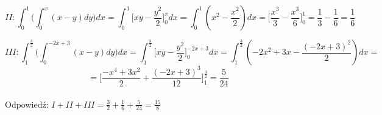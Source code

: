 \documentclass{article}
\begin{document}
$$II: \int_0^1 \Big(\int_0^{x} (x-y)dy\Big)dx = \int_0^1 \Big[ xy-\frac{y^2}{2}\Big]_{0}^{x} dx = \int_0^1 (x^2-\frac{x^2}{2}) dx = \Big[\frac{x^3}{3} - \frac{x^3}{6}\Big]_0^1 =\frac{1}{3}-\frac{1}{6} = \frac{1}{6}$$

$$III: \int_1^{\frac{3}{2}} \Big(\int_0^{-2x+3} (x-y)dy\Big)dx = \int_1^{\frac{3}{2}} \Big[ xy-\frac{y^2}{2}\Big]_{0}^{-2x+3} dx = \int_1^{\frac{3}{2}} (-2x^2+3x-\frac{(-2x+3)^2}{2}) dx = $$
$$= \Big[\frac{-x^4+3x^2}{2} + \frac{(-2x+3)^3}{12}\Big]_1^{\frac{3}{2}} = \frac{5}{24}$$ \\
Odpowiedź: $I + II + III = \frac{3}{2} + \frac{1}{6} + \frac{5}{24} = \frac{15}{8}$
\end{document}
